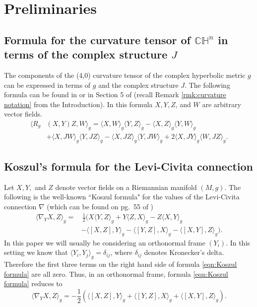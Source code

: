 \documentclass[10pt]{amsart}
\def\d{\delta}
\def\la{\langle}
\def\ra{\rangle}
\def\H{\mathbb{H}}
\def\C{\mathbb{C}}
\theoremstyle{definition}
\theoremstyle{remark}
\numberwithin{equation}{section}
\begin{document}
	














\vskip 20pt 

\section{Preliminaries}\label{section:preliminaries}

\subsection{Formula for the curvature tensor of $\C \H^n$ in terms of the complex structure $J$}
The components of the (4,0) curvature tensor of the complex hyperbolic metric $g$ can be expressed in terms of $g$ and the complex structure $J$.  
The following formula can be found in \cite{KN} or in Section 5 of \cite{Belegradek complex} (recall Remark \ref{rmk:curvature notation} from the Introduction).  
In this formula $X, Y, Z$, and $W$ are arbitrary vector fields.
	\begin{align}
	 \la R_g&(X,Y)Z,W \ra_g = \la X,W \ra_g \la Y,Z \ra_g - \la X,Z \ra_g \la Y,W \ra_g  \label{eqn:J curvature formula}\\
	&+  \la X,JW \ra_g \la Y,JZ \ra_g - \la X,JZ \ra_g \la Y,JW \ra_g + 2 \la X,JY \ra_g \la W,JZ \ra_g.  \nonumber
	\end{align}
	
	
	
\subsection{Koszul's formula for the Levi-Civita connection}
Let $X, Y,$ and $Z$ denote vector fields on a Riemannian manifold $(M,g)$.
The following is the well-known ``Koszul formula" for the values of the Levi-Civita connection $\nabla$ (which can be found on pg.\ 55 of \cite{do Carmo})
	\begin{align}
	\la \nabla_Y X, Z \ra_g = & \, \frac{1}{2} ( X \la Y,Z \ra_g + Y \la Z,X \ra_g - Z \la X,Y \ra_g  \label{eqn:Koszul formula}  \\
	&- \la [X,Z],Y \ra_g - \la [Y,Z], X \ra_g - \la [X,Y],Z \ra_g ) . \nonumber
	\end{align}
In this paper we will usually be considering an orthonormal frame $(Y_i )$.
In this setting we know that $\la Y_i , Y_j \ra_g = \d_{ij}$, where $\d_{ij}$ denotes Kronecker's delta.
Therefore the first three terms on the right hand side of formula \eqref{eqn:Koszul formula} are all zero.  
Thus, in an orthonormal frame, formula \eqref{eqn:Koszul formula} reduces to
	\begin{equation}
	\la \nabla_Y X, Z \ra_g = - \frac{1}{2} \left( \la [X,Z],Y \ra_g + \la [Y,Z], X \ra_g + \la [X,Y],Z \ra_g \right).  \label{eqn:connection}
	\end{equation}
	
\end{document}
